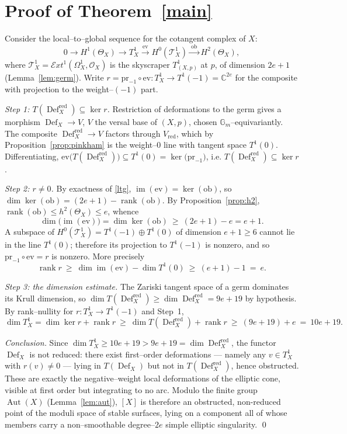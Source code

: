 \documentclass[11pt]{amsart}
\theoremstyle{definition}
\DeclareMathOperator{\Def}{Def}
\DeclareMathOperator{\im}{im}
\DeclareMathOperator{\Aut}{Aut}
\DeclareMathOperator{\rank}{rank}
\newcommand{\cO}{\mathcal{O}}
\newcommand{\cT}{\mathcal{T}}
\newcommand{\Om}{\Omega}
\newcommand{\CC}{\mathbb{C}}
\newcommand{\Gm}{\mathbb{G}_m}
\begin{document}
\section{Proof of Theorem~\ref{main}}

Consider the local--to--global sequence for the cotangent complex of $X$:
\begin{equation}\label{ltg}
0\to H^1(\Theta_X)\xrightarrow{\ } T^1_X \xrightarrow{\ \mathrm{ev}\ }
H^0(\cT^1_X)\xrightarrow{\ \mathrm{ob}\ } H^2(\Theta_X),
\end{equation}
where $\cT^1_X=\mathcal{E}xt^1(\Om^1_X,\cO_X)$ is the skyscraper $T^1_{(X,p)}$ at
$p$, of dimension $2e+1$ (Lemma~\ref{lem:germ}). Write
$r=\mathrm{pr}_{-1}\circ\mathrm{ev}\colon T^1_X\to T^1(-1)=\CC^{2e}$ for the
composite with projection to the weight--$(-1)$ part.

\medskip
\emph{Step 1: $T(\Def_X^{\mathrm{red}})\subseteq\ker r$.}
Restriction of deformations to the germ gives a morphism $\Def_X\to V$, $V$ the
versal base of $(X,p)$, chosen $\Gm$--equivariantly. The composite
$\Def_X^{\mathrm{red}}\to V$ factors through $V_{\mathrm{red}}$, which by
Proposition~\ref{prop:pinkham} is the weight--$0$ line with tangent space
$T^1(0)$. Differentiating, $\mathrm{ev}\big(T(\Def_X^{\mathrm{red}})\big)\subseteq
T^1(0)=\ker\big(\mathrm{pr}_{-1}\big)$, i.e. $T(\Def_X^{\mathrm{red}})\subseteq\ker r$.

\medskip
\emph{Step 2: $r\ne0$.}
By exactness of \eqref{ltg}, $\im(\mathrm{ev})=\ker(\mathrm{ob})$, so
$\dim\ker(\mathrm{ob})=(2e+1)-\rank(\mathrm{ob})$. By Proposition~\ref{prop:h2},
$\rank(\mathrm{ob})\le h^2(\Theta_X)\le e$, whence
\[
\dim\big(\im(\mathrm{ev})\big)=\dim\ker(\mathrm{ob})\ \ge\ (2e+1)-e=e+1.
\]
A subspace of $H^0(\cT^1_X)=T^1(-1)\oplus T^1(0)$ of dimension $e+1\ge6$ cannot
lie in the line $T^1(0)$; therefore its projection to $T^1(-1)$ is nonzero, and
so $\mathrm{pr}_{-1}\circ\mathrm{ev}=r$ is nonzero. More precisely
\[
\rank r\ \ge\ \dim\im(\mathrm{ev})-\dim T^1(0)\ \ge\ (e+1)-1\ =\ e.
\]

\medskip
\emph{Step 3: the dimension estimate.}
The Zariski tangent space of a germ dominates its Krull dimension, so
$\dim T(\Def_X^{\mathrm{red}})\ge\dim\Def_X^{\mathrm{red}}=9e+19$ by hypothesis.
By rank--nullity for $r\colon T^1_X\to T^1(-1)$ and Step~1,
\[
\dim T^1_X=\dim\ker r+\rank r\ \ge\ \dim T(\Def_X^{\mathrm{red}})+\rank r
\ \ge\ (9e+19)+e\ =\ 10e+19.
\]

\medskip
\emph{Conclusion.}
Since $\dim T^1_X\ge 10e+19>9e+19=\dim\Def_X^{\mathrm{red}}$, the functor
$\Def_X$ is not reduced: there exist first--order deformations --- namely any
$v\in T^1_X$ with $r(v)\ne0$ --- lying in $T(\Def_X)$ but not in
$T(\Def_X^{\mathrm{red}})$, hence obstructed. These are exactly the
negative--weight local deformations of the elliptic cone, visible at first order
but integrating to no arc. Modulo the finite group $\Aut(X)$
(Lemma~\ref{lem:aut}), $[X]$ is therefore an obstructed, non-reduced point of the
moduli space of stable surfaces, lying on a component all of whose members carry
a non--smoothable degree--$2e$ simple elliptic singularity. \qed
\end{document}

